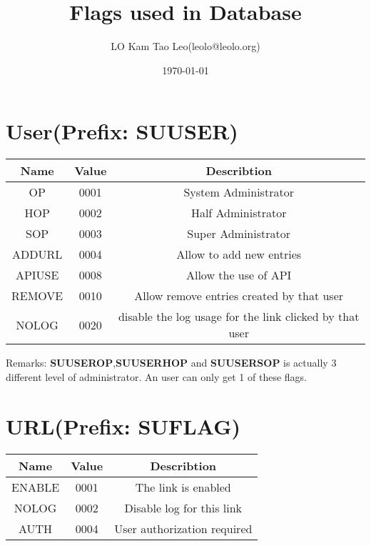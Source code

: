 \documentclass[a4paper,12pt,hidelinks]{article}
\title{Flags used in Database}
\author{LO Kam Tao Leo(leolo@leolo.org)}
\date{\today}
\newcommand{\us}{\textunderscore}
\begin{document}
\maketitle
\section{User(Prefix: SU\us USER\us)}
\begin{tabular}{c|c||c}
Name & Value & Describtion \\\hline
OP & 0001 & System Administrator \\ 
HOP & 0002 & Half Administrator\\
SOP & 0003 & Super Administrator\\\hline
ADDURL & 0004 & Allow to add new entries\\
APIUSE & 0008 & Allow the use of API\\
REMOVE & 0010 & Allow remove entries created by that user\\
NOLOG & 0020 & disable the log usage for the link clicked by that user
\end{tabular}

Remarks: \textbf{SU\us USER\us OP},\textbf{SU\us USER\us HOP} and \textbf{SU\us USER\us SOP} is actually 3 different level of administrator. An user can only get 1 of these flags.
\section{URL(Prefix: SU\us FLAG\us)}
\begin{tabular}{c|c||c}
Name & Value & Describtion \\\hline
ENABLE & 0001 & The link is enabled \\ 
NOLOG & 0002 & Disable log for this link\\
AUTH & 0004 & User authorization required\\
\end{tabular}
\end{document}
